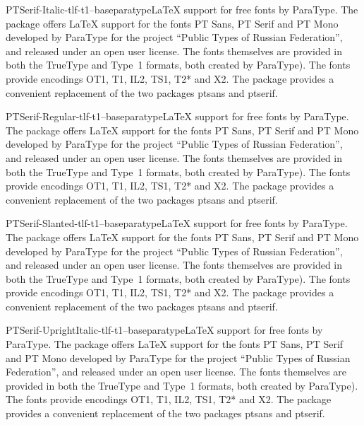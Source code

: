 \documentclass{ddltxtyp}
\begin{document}
\begin{package}{PTSerif-Italic-tlf-t1--base}{paratype}{{\LaTeX} support for free fonts by ParaType.}
The package offers {\LaTeX} support for the fonts PT Sans, PT
Serif and PT Mono developed by ParaType for the project ``Public
Types of Russian Federation'', and released under an open user
license. The fonts themselves are provided in both the TrueType
and Type~1 formats, both created by ParaType). The fonts
provide encodings OT1, T1, IL2, TS1, T2* and X2. The package
provides a convenient replacement of the two packages ptsans
and ptserif.
\end{package}
\begin{package}{PTSerif-Regular-tlf-t1--base}{paratype}{{\LaTeX} support for free fonts by ParaType.}
The package offers {\LaTeX} support for the fonts PT Sans, PT
Serif and PT Mono developed by ParaType for the project ``Public
Types of Russian Federation'', and released under an open user
license. The fonts themselves are provided in both the TrueType
and Type~1 formats, both created by ParaType). The fonts
provide encodings OT1, T1, IL2, TS1, T2* and X2. The package
provides a convenient replacement of the two packages ptsans
and ptserif.
\end{package}
\begin{package}{PTSerif-Slanted-tlf-t1--base}{paratype}{{\LaTeX} support for free fonts by ParaType.}
The package offers {\LaTeX} support for the fonts PT Sans, PT
Serif and PT Mono developed by ParaType for the project ``Public
Types of Russian Federation'', and released under an open user
license. The fonts themselves are provided in both the TrueType
and Type~1 formats, both created by ParaType). The fonts
provide encodings OT1, T1, IL2, TS1, T2* and X2. The package
provides a convenient replacement of the two packages ptsans
and ptserif.
\end{package}
\begin{package}{PTSerif-UprightItalic-tlf-t1--base}{paratype}{{\LaTeX} support for free fonts by ParaType.}
The package offers {\LaTeX} support for the fonts PT Sans, PT
Serif and PT Mono developed by ParaType for the project ``Public
Types of Russian Federation'', and released under an open user
license. The fonts themselves are provided in both the TrueType
and Type~1 formats, both created by ParaType). The fonts
provide encodings OT1, T1, IL2, TS1, T2* and X2. The package
provides a convenient replacement of the two packages ptsans
and ptserif.
\end{package}
\end{document}
